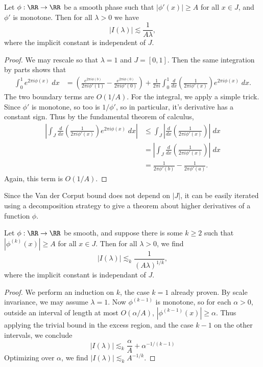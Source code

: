 \begin{lemma}
  Let $\phi: \RR \to \RR$ be a smooth phase such that $|\phi'(x)| \geq A$ for all $x \in J$, and $\phi'$ is monotone. Then for all $\lambda > 0$ we have
  \[ |I(\lambda)| \lesssim \frac{1}{A \lambda}, \]
  where the implicit constant is independent of $J$.
\end{lemma}
\begin{proof}
  We may rescale so that $\lambda = 1$ and $J = [0,1]$. Then the same integration by parts shows that
  \begin{align*}
    \int_0^1 e^{2 \pi i \phi(x)}\; dx &= \left( \frac{e^{2 \pi i \phi(b)}}{2 \pi i \phi'(1)} - \frac{e^{2 \pi i \phi(0)}}{2 \pi i \phi'(0)} \right) + \frac{1}{2 \pi i} \int_0^1 \frac{d}{dx} \left( \frac{1}{2 \pi i \phi'(x)} \right) e^{2 \pi i \phi(x)}\; dx.
  \end{align*}
  The two boundary terms are $O(1/A)$. For the integral, we apply a simple trick. Since $\phi'$ is monotone, so too is $1/\phi'$, so in particular, it's derivative has a constant sign. Thus by the fundamental theorem of calculus,
  \begin{align*}
    \left| \int_J \frac{d}{dx} \left( \frac{1}{2 \pi i \phi'(x)} \right) e^{2 \pi i \phi(x)}\; dx \right| &\leq \int_J \left| \frac{d}{dx} \left( \frac{1}{2 \pi i \phi'(x)} \right)  \right|\; dx\\
    &= \left| \int_J \frac{d}{dx} \left( \frac{1}{2 \pi i \phi'(x)} \right) \right|\; dx\\
    &= \frac{1}{2 \pi \phi'(b)} - \frac{1}{2 \pi \phi'(a)}.
  \end{align*}
  Again, this term is $O(1/A)$.
\end{proof}

Since the Van der Corput bound does not depend on $|J|$, it can be easily iterated using a decomposition strategy to give a theorem about higher derivatives of a function $\phi$.

\begin{lemma}
  Let $\phi: \RR \to \RR$ be smooth, and suppose there is some $k \geq 2$ such that $|\phi^{(k)}(x)| \geq A$ for all $x \in J$. Then for all $\lambda > 0$, we find
  \[ |I(\lambda)| \lesssim_k \frac{1}{(A \lambda)^{1/k}}, \]
  where the implicit constant is independant of $J$.
\end{lemma}
\begin{proof}
  We perform an induction on $k$, the case $k = 1$ already proven. By scale invariance, we may assume $\lambda = 1$. Now $\phi^{(k-1)}$ is monotone, so for each $\alpha > 0$, outside an interval of length at most $O(\alpha/A)$, $|\phi^{(k-1)}(x)| \geq \alpha$. Thus applying the trivial bound in the excess region, and the case $k - 1$ on the other intervals, we conclude
  \[ |I(\lambda)| \lesssim_k \frac{\alpha}{A} + \alpha^{-1/(k-1)} \]
  Optimizing over $\alpha$, we find $|I(\lambda)| \lesssim_k A^{-1/k}$.
\end{proof}

